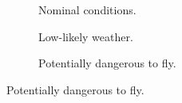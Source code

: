 \begin{figure}[t!]
    \centering

    \begin{subfigure}[b]{0.32\textwidth}
        \centering
        \caption{Nominal conditions.}
        \label{fig:radnet_nominal}
    \end{subfigure}
    \hfill
    \begin{subfigure}[b]{0.32\textwidth}
        \centering
        \caption{Low-likely weather.}
        \label{fig:radnet_weather}
    \end{subfigure}
    \hfill
    \begin{subfigure}[b]{0.32\textwidth}
        \centering
        \caption{Potentially dangerous to fly.}
        \label{fig:radnet_dangerous}
    \end{subfigure}


\end{figure}
